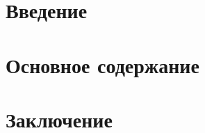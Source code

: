 \documentclass{mipt-thesis-bs}
\author{Суслов Антон}
\date{}
\begin{document}
\tableofcontents

\chapter{Введение}

\chapter{Основное содержание}

\chapter{Заключение}

\printbibliography
\end{document}
